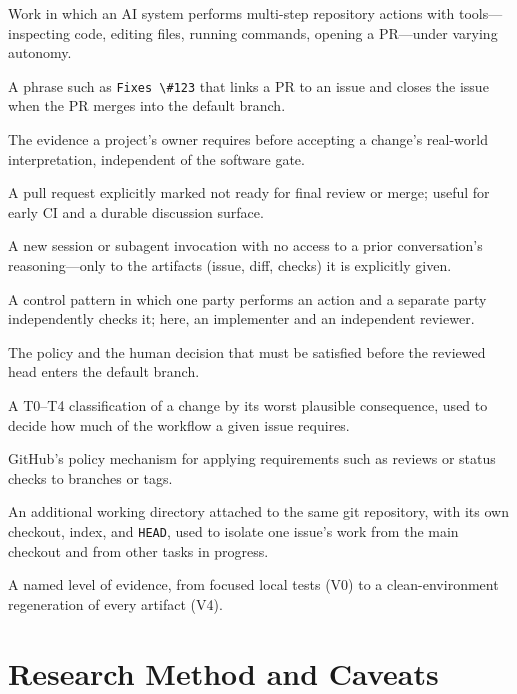 \documentclass[11pt]{article}
\newcommand{\co}[1]{\lstinline[basicstyle=\ttfamily\color{gwInk}]{#1}}
\begin{document}
\begin{description}[leftmargin=0pt,style=nextline,itemsep=2pt]
  \item[Agentic software development] Work in which an AI system performs multi-step repository
    actions with tools---inspecting code, editing files, running commands, opening a PR---under
    varying autonomy.
  \item[Closing keyword] A phrase such as \co{Fixes \#123} that links a PR to an issue and closes
    the issue when the PR merges into the default branch.
  \item[Domain gate] The evidence a project's owner requires before accepting a change's
    real-world interpretation, independent of the software gate.
  \item[Draft PR] A pull request explicitly marked not ready for final review or merge; useful
    for early CI and a durable discussion surface.
  \item[Fresh context] A new session or subagent invocation with no access to a prior
    conversation's reasoning---only to the artifacts (issue, diff, checks) it is explicitly given.
  \item[Maker-checker] A control pattern in which one party performs an action and a separate
    party independently checks it; here, an implementer and an independent reviewer.
  \item[Merge gate] The policy and the human decision that must be satisfied before the reviewed
    head enters the default branch.
  \item[Risk tier] A T0--T4 classification of a change by its worst plausible consequence, used
    to decide how much of the workflow a given issue requires.
  \item[Ruleset] GitHub's policy mechanism for applying requirements such as reviews or status
    checks to branches or tags.
  \item[Task worktree] An additional working directory attached to the same git repository, with
    its own checkout, index, and \co{HEAD}, used to isolate one issue's work from the main
    checkout and from other tasks in progress.
  \item[Validation tier] A named level of evidence, from focused local tests (V0) to a
    clean-environment regeneration of every artifact (V4).
\end{description}

\section*{Research Method and Caveats}
\end{document}
